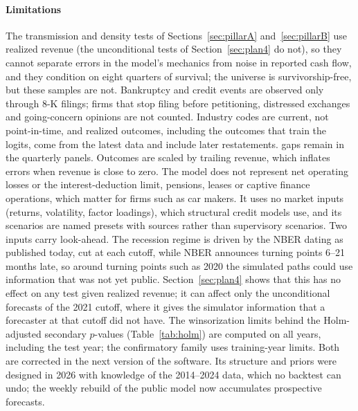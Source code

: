 \documentclass[preprint,12pt,authoryear]{elsarticle}
\begin{document}
\paragraph{Limitations} The transmission and density tests of Sections~\ref{sec:pillarA} and~\ref{sec:pillarB} use realized revenue (the unconditional tests of Section~\ref{sec:plan4} do not), so they cannot separate errors in the model's mechanics from noise in reported cash flow, and they condition on eight quarters of survival; the universe is survivorship-free, but these samples are not. Bankruptcy and credit events are observed only through 8-K filings; firms that stop filing before petitioning, distressed exchanges and going-concern opinions are not counted. Industry codes are current, not point-in-time, and realized outcomes, including the outcomes that train the logits, come from the latest data and include later restatements. \AudGapsNew{} gaps remain in the quarterly panels. Outcomes are scaled by trailing revenue, which inflates errors when revenue is close to zero. The model does not represent net operating losses or the interest-deduction limit, pensions, leases or captive finance operations, which matter for firms such as car makers. It uses no market inputs (returns, volatility, factor loadings), which structural credit models use, and its scenarios are named presets with sources rather than supervisory scenarios. Two inputs carry look-ahead. The recession regime is driven by the NBER dating as published today, cut at each cutoff, while NBER announces turning points 6--21 months late, so around turning points such as 2020 the simulated paths could use information that was not yet public. Section~\ref{sec:plan4} shows that this has no effect on any test given realized revenue; it can affect only the unconditional forecasts of the 2021 cutoff, where it gives the simulator information that a forecaster at that cutoff did not have. The winsorization limits behind the Holm-adjusted secondary $p$-values (Table~\ref{tab:holm}) are computed on all years, including the test year; the confirmatory family uses training-year limits. Both are corrected in the next version of the software. Its structure and priors were designed in 2026 with knowledge of the 2014--2024 data, which no backtest can undo; the weekly rebuild of the public model now accumulates prospective forecasts.
\end{document}
